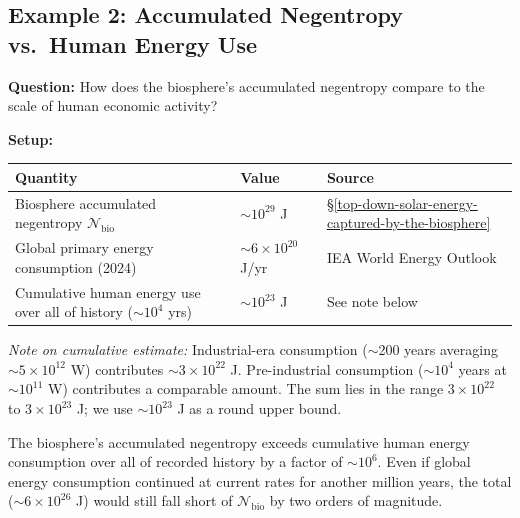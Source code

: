 \documentclass[11pt]{article}
\theoremstyle{plain}
\theoremstyle{definition}
\theoremstyle{remark}
\newcounter{none}
\let\origsubsection\subsection
\renewcommand{\subsection}{\needspace{7\baselineskip}\origsubsection}
\begin{document}
\subsection{Example 2: Accumulated Negentropy vs.~Human Energy
Use}\label{example-2-accumulated-negentropy-vs.-human-energy-use}

\textbf{Question:} How does the biosphere's accumulated negentropy
compare to the scale of human economic activity?

\textbf{Setup:}

{\def\LTcaptype{none} %
\begin{longtable}[]{@{}
  >{\raggedright\arraybackslash}p{}
  >{\raggedright\arraybackslash}p{}
  >{\raggedright\arraybackslash}p{}@{}}
\toprule\noalign{}
\begin{minipage}[b]{\linewidth}\raggedright
Quantity
\end{minipage} & \begin{minipage}[b]{\linewidth}\raggedright
Value
\end{minipage} & \begin{minipage}[b]{\linewidth}\raggedright
Source
\end{minipage} \\
\midrule\noalign{}
\endhead
\bottomrule\noalign{}
\endlastfoot
Biosphere accumulated negentropy \(\mathcal{N}_{\text{bio}}\) &
\(\sim 10^{29}\) J &
§\ref{top-down-solar-energy-captured-by-the-biosphere} \\
Global primary energy consumption (2024) & \(\sim 6 \times 10^{20}\)
J/yr & IEA World Energy Outlook \\
Cumulative human energy use over all of history (\(\sim 10^4\) yrs) &
\(\sim 10^{23}\) J & See note below \\
\end{longtable}
}

\emph{Note on cumulative estimate:} Industrial-era consumption
($\sim$200 years averaging \(\sim 5 \times 10^{12}\) W) contributes
\(\sim 3 \times 10^{22}\) J. Pre-industrial consumption (\(\sim 10^4\)
years at \(\sim 10^{11}\) W) contributes a comparable amount. The sum
lies in the range \(3 \times 10^{22}\) to \(3 \times 10^{23}\) J; we use
\(\sim 10^{23}\) J as a round upper bound.

The biosphere's accumulated negentropy exceeds cumulative human energy
consumption over all of recorded history by a factor of \(\sim 10^6\).
Even if global energy consumption continued at current rates for another
million years, the total (\(\sim 6 \times 10^{26}\) J) would still fall
short of \(\mathcal{N}_{\text{bio}}\) by two orders of magnitude.
\end{document}
